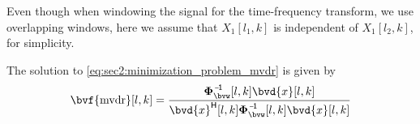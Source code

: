 Even though when windowing the signal for the time-frequency transform, we use overlapping windows, here we assume that $X_1[l_1,k]$ is independent of $X_1[l_2,k]$, for simplicity.

The solution to \cref{eq:sec2:minimization_problem_mvdr} is given by
\begin{equation}
	\bvf{\mvdr}[l,k] = \frac{ \inv{\Corr{\bvw}}[l,k] \bvd{x}[l,k] }{ \he{\bvd{x}}[l,k] \inv{\Corr{\bvw}}[l,k] \bvd{x}[l,k] }
\end{equation}


%
%
